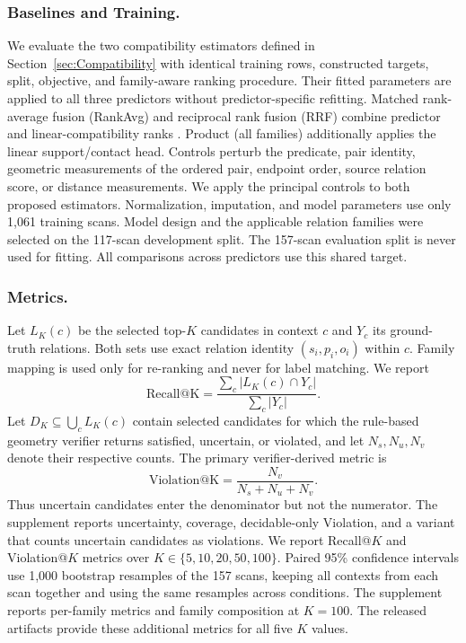 \subsubsection{Baselines and Training.}
We evaluate the two compatibility estimators defined in Section~\ref{sec:Compatibility} with identical training rows, constructed targets, split, objective, and family-aware ranking procedure. Their fitted parameters are applied to all three predictors without predictor-specific refitting. Matched rank-average fusion (RankAvg) and reciprocal rank fusion (RRF) combine predictor and linear-compatibility ranks \cite{10.1145/1571941.1572114}. Product (all families) additionally applies the linear support/contact head. Controls perturb the predicate, pair identity, geometric measurements of the ordered pair, endpoint order, source relation score, or distance measurements. We apply the principal controls to both proposed estimators.
Normalization, imputation, and model parameters use only 1,061 training scans. Model design and the applicable relation families were selected on the 117-scan development split. The 157-scan evaluation split is never used for fitting. All comparisons across predictors use this shared target.

\subsubsection{Metrics.}
Let $L_K(c)$ be the selected top-$K$ candidates in context $c$ and $Y_c$ its ground-truth relations. Both sets use exact relation identity $(s_i,p_i,o_i)$ within $c$. Family mapping is used only for re-ranking and never for label matching. We report
\begin{equation}
\mathrm{Recall@K}=\frac{\sum_c |L_K(c)\cap Y_c|}{\sum_c |Y_c|}.
\end{equation}
Let $D_K\subseteq\bigcup_c L_K(c)$ contain selected candidates for which the rule-based geometry verifier returns satisfied, uncertain, or violated, and let $N_s,N_u,N_v$ denote their respective counts. The primary verifier-derived metric is
\begin{equation}
\mathrm{Violation@K}=\frac{N_v}{N_s+N_u+N_v}.
\end{equation}
Thus uncertain candidates enter the denominator but not the numerator. 
The supplement reports uncertainty, coverage, decidable-only Violation, and a variant that counts uncertain candidates as violations.
We report Recall@$K$ and Violation@$K$ metrics over $K \in \{5, 10, 20, 50, 100\}$. Paired 95\% confidence intervals use 1,000 bootstrap resamples of the 157 scans, keeping all contexts from each scan together and using the same resamples across conditions. The supplement reports per-family metrics and family composition at $K=100$. The released artifacts provide these additional metrics for all five \(K\) values.

